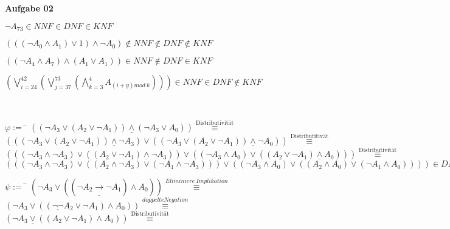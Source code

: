 \documentclass[a4paper,10pt]{article}
\begin{document}
	\textbf{Aufgabe 02}
	\begin{compactenum} [(a)]
		\item 
		\begin{compactenum} [(i)]
			\item $ \lnot A_{73} \in NNF \in DNF \in KNF $
			\item $ (((\lnot A_0 \wedge A_1)\vee 1)\wedge \lnot A_0) \not\in NNF \not\in DNF \not\in KNF$
			\item $ ((\lnot A_4 \wedge A_7)\wedge (A_1 \vee A_1)) \in NNF \not\in DNF \in KNF $
			\item $ (\bigvee\limits_{i = 24}^{42} (\bigvee\limits_{j=37}^{73} (\bigwedge\limits_{k=3}^{4} A_{(i+y) mod\ k}))) \in NNF \in DNF \not\in KNF $
		\end{compactenum} \ \\
		\item \begin{compactitem}
			\item \begin{tabbing}
				$ \varphi := $ 
				\= $ ((\lnot A_3 \vee (A_2 \vee \lnot A_1)) \underline{\wedge} (\lnot A_3 \vee A_0)) \stackrel{\text{Distributivität}}{\equiv} $ \\
				\> $ (((\lnot A_3 \vee (A_2 \vee \lnot A_1))\underline{\wedge} \lnot A_3)\vee ((\lnot A_3 \vee (A_2 \vee \lnot A_1))\underline{\wedge} \lnot A_0)) \stackrel{\text{Distributitivät}}{\equiv}$ \\
				\> $ (((\lnot A_3 \wedge \lnot A_3) \vee ((A_2 \vee \lnot A_1)\underline{\wedge} \lnot A_3))\vee ((\lnot A_3 \wedge A_0)\vee ((A_2 \vee \lnot A_1) \underline{\wedge} A_0))) \stackrel{\text{Distributivität}}{\equiv} $ \\
				\> $ (((\lnot A_3 \wedge \lnot A_3) \vee ((A_2 \wedge \lnot A_3) \vee (\lnot A_1 \wedge \lnot A_3))) \vee ((\lnot A_3 \wedge A_0)\vee((A_2\wedge A_0) \vee (\lnot A_1 \wedge A_0 )))) \in DNF $	
			\end{tabbing}
			\item \begin{tabbing}
				$ \psi :=$
				\= $ (\lnot A_3 \vee ((\lnot A_2 \underline{\rightarrow} \lnot A_1)\wedge A_0)) \stackrel{Eliminiere\ Implikation}{\equiv}$ \\
				\> $ (\lnot A_3 \vee ((\underline{\lnot \lnot} A_2 \vee \lnot A_1)\wedge A_0)) \stackrel{doppelte Negation}{\equiv} $ \\
				\> $ (\lnot A_3 \underline{\vee} ((A_2 \vee \lnot A_1)\wedge A_0)) \stackrel{\text{Distributivität}}{\equiv}$ \\

\end{tabbing}
\end{compactitem}
\end{compactenum}
\end{document}
